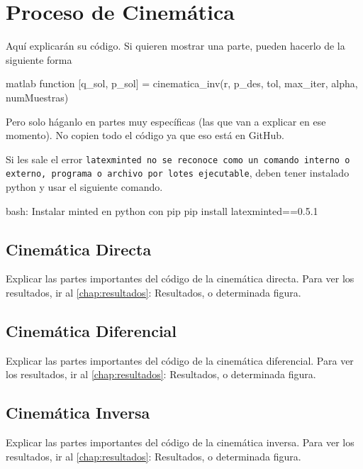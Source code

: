 \section{Proceso de Cinemática} \label{sec:proceso_cinematica}

Aquí explicarán su código. Si quieren mostrar una parte, pueden hacerlo de la siguiente forma

\begin{matlabcode}{matlab}
	function [q_sol, p_sol] = cinematica_inv(r, p_des, tol, max_iter, alpha, numMuestras)
\end{matlabcode}

Pero solo háganlo en partes muy específicas (las que van a explicar en ese momento). No copien todo el código ya que eso está en GitHub.

Si les sale el error \texttt{latexminted no se reconoce como un comando interno o externo, programa o archivo por lotes ejecutable}, deben tener instalado python y usar el siguiente comando.
\begin{terminal}{bash: Instalar minted en python con pip}
	pip install latexminted==0.5.1
\end{terminal}

\subsection{Cinemática Directa}
Explicar las partes importantes del código de la cinemática directa.
Para ver los resultados, ir al \autoref{chap:resultados}: Resultados, o determinada figura.
\subsection{Cinemática Diferencial}
Explicar las partes importantes del código de la cinemática diferencial.
Para ver los resultados, ir al \autoref{chap:resultados}: Resultados, o determinada figura.
\subsection{Cinemática Inversa}
Explicar las partes importantes del código de la cinemática inversa.
Para ver los resultados, ir al \autoref{chap:resultados}: Resultados, o determinada figura.